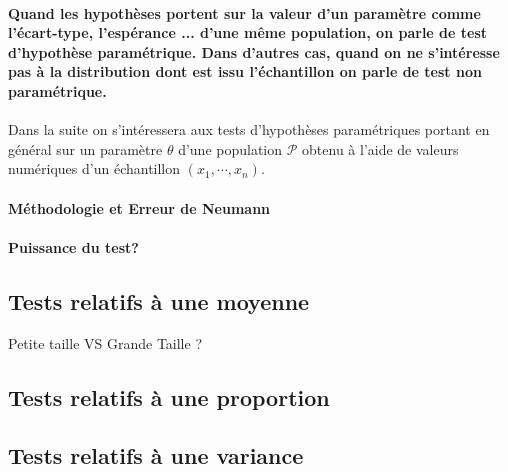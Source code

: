 \paragraph{Quand les hypothèses portent sur la valeur d'un paramètre comme l'écart-type, l'espérance ... d'une même population, on parle de test d'hypothèse {\bf{paramétrique}}. Dans d'autres cas, quand on ne s'intéresse pas à la distribution dont est issu l'échantillon on parle de test {\bf{non paramétrique}}.}
Dans la suite on s'intéressera aux tests d'hypothèses paramétriques portant en général sur un paramètre $\theta$ d'une population $\mathcal{P}$ obtenu à l'aide de valeurs numériques d'un échantillon $(x_1,\cdots{},x_n)$. 
\paragraph{Méthodologie et Erreur de Neumann}


\paragraph{Puissance du test?}

\subsection{Tests relatifs à une moyenne}

Petite taille VS Grande Taille ?





\subsection{Tests relatifs à une proportion}






\subsection{Tests relatifs à une variance}
